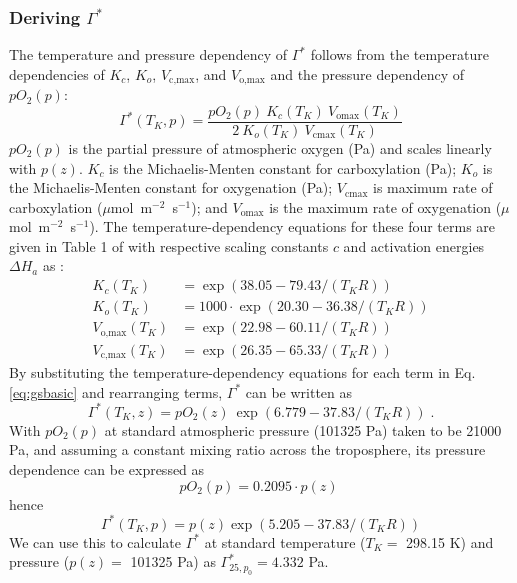 \documentclass{myreport}
\begin{document}
\subsubsection{Deriving $\Gamma^\ast$}
The temperature and pressure dependency of $\Gamma^\ast$ follows from the temperature dependencies of $K_c$, $K_o$, $V_\text{c,max}$, and $V_\text{o,max}$ and the pressure dependency of $pO_2(p)$:
\begin{equation}
\label{eq:gsbasic}
    \Gamma^\ast (T_K, p) = \frac{pO_2(p)\: K_c(T_K)\: V_\text{omax}(T_K)}
                        {2\: K_o(T_K)\: V_\text{cmax}(T_K)}
\end{equation}
$pO_2(p)$ is the partial pressure of atmospheric oxygen (Pa) and scales linearly with $p(z)$. $K_c$ is the Michaelis-Menten constant for carboxylation (Pa); $K_o$ is the Michaelis-Menten constant for oxygenation (Pa); $V_\text{cmax}$ is maximum rate of carboxylation ($\mu$mol~m$^{-2}$~s$^{-1}$); and $V_\text{omax}$ is the maximum rate of oxygenation ($\mu$mol~m$^{-2}$~s$^{-1}$). The temperature-dependency equations for these four terms are given in Table 1 of \cite{bernacchi01} with respective scaling constants $c$ and activation energies $\Delta H_a$ as :
\begin{subequations}
\begin{align}
    K_c(T_K) &= \exp(38.05-79.43/(T_K R)) \\
    K_o(T_K) &= 1000 \cdot \exp(20.30-36.38/(T_K R)) \\
    V_\text{o,max}(T_K) &= \exp(22.98-60.11/(T_K R)) \\
    V_\text{c,max}(T_K) &= \exp(26.35-65.33/(T_K R))
\end{align}
\end{subequations}
By substituting the temperature-dependency equations for each term in Eq. \ref{eq:gsbasic} and rearranging terms, $\Gamma^\ast$ can be written as
\begin{equation}
    \label{eq:gsto}
    \Gamma^\ast(T_K, z) = pO_2(z)\: \exp(6.779-37.83/(T_K R))\;.
\end{equation}
With $pO_2(p)$ at standard atmospheric pressure (101325 Pa) taken to be 21000 Pa, and assuming a constant mixing ratio across the troposphere, its pressure dependence can be expressed as 
\begin{equation}
    \label{eq:oxy}
    pO_2(p) = 0.2095 \cdot p(z)\;
\end{equation}
hence
\begin{equation}
    \label{eq:gstop}
    \Gamma^\ast(T_K, p) = p(z) \exp(5.205-37.83/(T_K R))  %
\end{equation}
We can use this to calculate $\Gamma^\ast$ at standard temperature ($T_K=$ 298.15 K) and pressure ($p(z)=$ 101325 Pa) as $\Gamma^\ast_{25, p_0} = 4.332$ Pa. 
\end{document}
